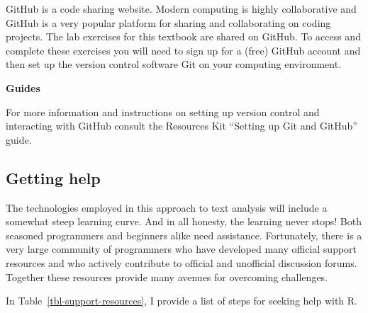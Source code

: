 \documentclass[
  letterpaper,
  krantz1]{latex/krantz-mod}
\theoremstyle{definition}
\theoremstyle{definition}
\theoremstyle{remark}
\begin{document}
GitHub is a code sharing website. Modern computing is highly
collaborative and GitHub is a very popular platform for sharing and
collaborating on coding projects. The lab exercises for this textbook
are shared on GitHub. To access and complete these exercises you will
need to sign up for a (free) GitHub account and then set up the version
control software Git on your computing environment.

\begin{tcolorbox}[enhanced jigsaw, leftrule=.75mm, colframe=quarto-callout-color-frame, left=2mm, colback=white, toprule=.15mm, breakable, arc=.35mm, opacityback=0, bottomrule=.15mm, rightrule=.15mm]

\textbf{ Guides}

For more information and instructions on setting up version control and
interacting with GitHub consult the Resources Kit ``Setting up Git and
GitHub'' guide.

\end{tcolorbox}

\subsection*{Getting help}\label{sec-preface-getting-help}

The technologies employed in this approach to text analysis will include
a somewhat steep learning curve. And in all honesty, the learning never
stops! Both seasoned programmers and beginners alike need assistance.
Fortunately, there is a very large community of programmers who have
developed many official support resources and who actively contribute to
official and unofficial discussion forums. Together these resources
provide many avenues for overcoming challenges.

In Table~\ref{tbl-support-resources}, I provide a list of steps for
seeking help with R.
\end{document}
